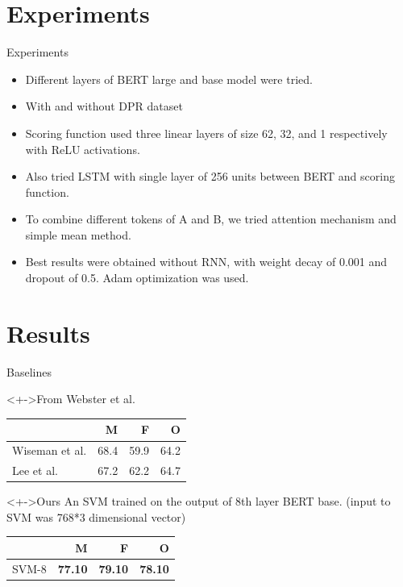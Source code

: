 \documentclass[10pt]{beamer}
\begin{document}
\section{Experiments}
\begin{frame}{Experiments}
  \begin{itemize}
  \item<+-> Different layers of BERT large and base model were tried.
  \item<+-> With and without DPR dataset
  \item<+-> Scoring function used three linear layers of size 62, 32, and 1 respectively with ReLU activations.
  \item<+-> Also tried LSTM with single layer of 256 units between BERT and scoring function.
  \item<+-> To combine different tokens of A and B, we tried attention mechanism and simple mean method.
  \item<+-> Best results were obtained without RNN, with weight decay of 0.001 and dropout of 0.5. Adam optimization was used.
  \end{itemize}
\end{frame}

\section{Results}
\begin{frame}{Baselines}
  \begin{block}<+->{From Webster et al. \cite{webster2018gap}}
    \begin{table}
      \centering
      \begin{tabular}{|l|r|r|r|}
        \hline
        & M & F & O \\
        \hline
        Wiseman et al. \cite{wiseman2016learning} & 68.4 & 59.9 & 64.2 \\
        Lee et al. \cite{lee2017end} & 67.2 & 62.2 & 64.7 \\
        \hline
      \end{tabular}
    \end{table}

  \end{block}
  
  \begin{block}<+->{Ours}
    An SVM trained on the output of 8th layer BERT base. (input to SVM was 768*3 dimensional vector)
    \begin{table}
      \centering
      \begin{tabular}{|l|r|r|r|}
        \hline
        & M & F & O \\
        \hline
        SVM-8 & \textbf{77.10} & \textbf{79.10} & \textbf{78.10} \\
        \hline
      \end{tabular}
    \end{table}
  \end{block}
\end{frame}
\end{document}
